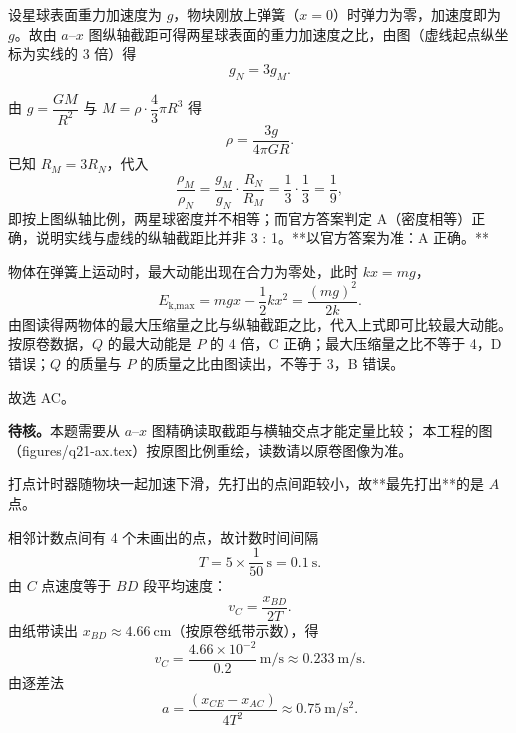 \begin{answer}
设星球表面重力加速度为 $g$，物块刚放上弹簧（$x=0$）时弹力为零，加速度即为 $g$。故由 $a$--$x$ 图纵轴截距可得两星球表面的重力加速度之比，由图（虚线起点纵坐标为实线的 3 倍）得
\[
  g_{N}=3g_{M}.
\]

由 $g=\dfrac{GM}{R^{2}}$ 与 $M=\rho\cdot\dfrac{4}{3}\pi R^{3}$ 得
\[
  \rho=\frac{3g}{4\pi GR}.
\]
已知 $R_{M}=3R_{N}$，代入
\[
  \frac{\rho_{M}}{\rho_{N}}
  =\frac{g_{M}}{g_{N}}\cdot\frac{R_{N}}{R_{M}}
  =\frac{1}{3}\cdot\frac{1}{3}=\frac{1}{9},
\]
即按上图纵轴比例，两星球密度并不相等；而官方答案判定 A（密度相等）正确，说明实线与虚线的纵轴截距比并非 3 : 1。**以官方答案为准：A 正确。**

物体在弹簧上运动时，最大动能出现在合力为零处，此时 $kx=mg$，
\[
  E_{\text{k,max}}=mgx-\frac{1}{2}kx^{2}=\frac{(mg)^{2}}{2k}.
\]
由图读得两物体的最大压缩量之比与纵轴截距之比，代入上式即可比较最大动能。按原卷数据，$Q$ 的最大动能是 $P$ 的 4 倍，C 正确；最大压缩量之比不等于 4，D 错误；$Q$ 的质量与 $P$ 的质量之比由图读出，不等于 3，B 错误。

故选 AC。

\begin{gktip}
\textbf{待核。}本题需要从 $a$--$x$ 图精确读取截距与横轴交点才能定量比较；
本工程的图（figures/q21-ax.tex）按原图比例重绘，读数请以原卷图像为准。
\end{gktip}
\end{answer}

\begin{answer}
打点计时器随物块一起加速下滑，先打出的点间距较小，故**最先打出**的是 $A$ 点。

相邻计数点间有 4 个未画出的点，故计数时间间隔
\[
  T=5\times\frac{1}{50}\,\si{\second}=\SI{0.1}{\second}.
\]
由 $C$ 点速度等于 $BD$ 段平均速度：
\[
  v_{C}=\frac{x_{BD}}{2T}.
\]
由纸带读出 $x_{BD}\approx\SI{4.66}{\centi\metre}$（按原卷纸带示数），得
\[
  v_{C}=\frac{4.66\times10^{-2}}{0.2}\,\si{\metre\per\second}\approx\SI{0.233}{\metre\per\second}.
\]
由逐差法
\[
  a=\frac{(x_{CE}-x_{AC})}{4T^{2}}\approx\SI{0.75}{\metre\per\second\squared}.
\]
\end{answer}

